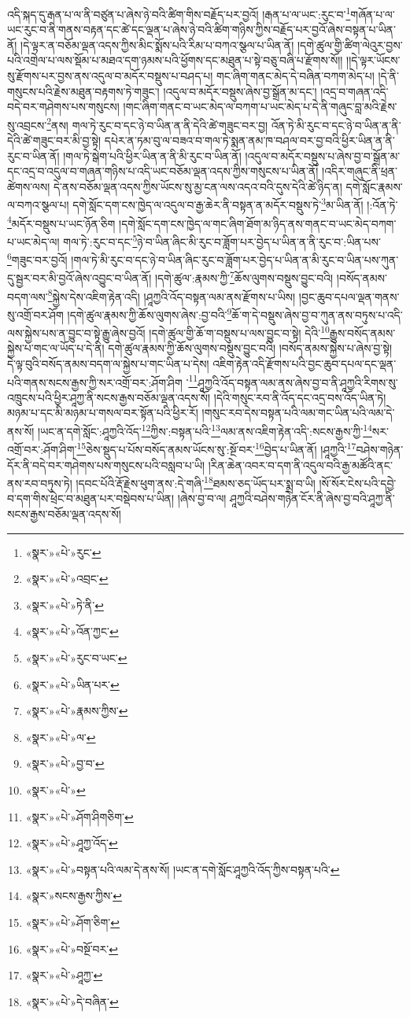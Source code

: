 འདི་སྐད་དུ་རྒན་པ་ལ་ནི་བཙུན་པ་ཞེས་ཉེ་བའི་ཚིག་གིས་བརྗོད་པར་བྱའོ། །རྒན་པ་ལ་ཡང་:རུང་བ་\footnote{«སྣར་»«པེ་»རུང་}གཞོན་པ་ལ་ཡང་རུང་བ་ནི་གནས་བརྟན་དང་ཚེ་དང་ལྡན་པ་ཞེས་ཉེ་བའི་ཚིག་གཉིས་ཀྱིས་བརྗོད་པར་བྱའོ་ཞེས་བསྟན་པ་ཡིན་ནོ། །དེ་ལྟར་ན་བཅོམ་ལྡན་འདས་ཀྱིས་མིང་སྨོས་པའི་རིམ་པ་བཀའ་སྩལ་པ་ཡིན་ནོ། །དགེ་ཚུལ་གྱི་ཚིག་ལེའུར་བྱས་པའི་འགྲེལ་པ་ལས་སྡོམ་པ་མཐའ་དག་ཉམས་པའི་ཕྱོགས་དང་མཐུན་པ་སྟེ་བཅུ་བཞི་པ་རྫོགས་སོ།། །།དེ་ལྟར་ཡོངས་སུ་རྫོགས་པར་བྱས་ནས་འདུལ་བ་མདོར་བསྡུས་པ་བཤད་པ། གང་ཞིག་གནང་མེད་དེ་བཞིན་བཀག་མེད་པ། །དེ་ནི་གསུངས་པའི་རྗེས་མཐུན་བརྟགས་ཏེ་གཟུང་། །འདུལ་བ་མདོར་བསྡུས་ཞེས་བྱ་སྒྲོན་མ་དང་། །འདྲ་བ་གཞན་འདི་བདེ་བར་གཤེགས་པས་གསུངས། །གང་ཞིག་གནང་བ་ཡང་མེད་ལ་བཀག་པ་ཡང་མེད་པ་དེ་ནི་གཞུང་བླ་མའི་རྗེས་སུ་འབྲངས་\footnote{«སྣར་»«པེ་»འབྲང་}ནས། གལ་ཏེ་རུང་བ་དང་ཉེ་བ་ཡིན་ན་ནི་དེའི་ཚེ་གཟུང་བར་བྱ། འོན་ཏེ་མི་རུང་བ་དང་ཉེ་བ་ཡིན་ན་ནི་དེའི་ཚེ་གཟུང་བར་མི་བྱ་སྟེ། དཔེར་ན་ཏམ་བུ་ལ་བཟའ་བ་གལ་ཏེ་སྨན་ནམ་ཁ་བཤལ་བར་བྱ་བའི་ཕྱིར་ཡིན་ན་ནི་རུང་བ་ཡིན་ནོ། །གལ་ཏེ་སྒེག་པའི་ཕྱིར་ཡིན་ན་ནི་མི་རུང་བ་ཡིན་ནོ། །འདུལ་བ་མདོར་བསྡུས་པ་ཞེས་བྱ་བ་སྒྲོན་མ་དང་འདྲ་བ་འདུལ་བ་གཞན་གཉིས་པ་འདི་ཡང་བཅོམ་ལྡན་འདས་ཀྱིས་གསུངས་པ་ཡིན་ནོ། །འདིར་གཞུང་ནི་ཕྲན་ཚེགས་ལས། དེ་ནས་བཅོམ་ལྡན་འདས་ཀྱིས་ཡོངས་སུ་མྱ་ངན་ལས་འདའ་བའི་དུས་དེའི་ཚེ་ཉིད་ན། དགེ་སློང་རྣམས་ལ་བཀའ་སྩལ་པ། དགེ་སློང་དག་ངས་ཁྱེད་ལ་འདུལ་བ་རྒྱ་ཆེར་ནི་བསྟན་ན་མདོར་བསྡུས་ཏེ་\footnote{«སྣར་»«པེ་»ཏེ་ནི་}མ་ཡིན་ནོ། །:འོན་ཏེ་\footnote{«སྣར་»«པེ་»འོན་ཀྱང་}མདོར་བསྡུས་པ་ཡང་ཉོན་ཅིག །དགེ་སློང་དག་ངས་ཁྱེད་ལ་གང་ཞིག་ཐོག་མ་ཉིད་ནས་གནང་བ་ཡང་མེད་བཀག་པ་ཡང་མེད་ལ། གལ་ཏེ་:རུང་བ་དང་\footnote{«སྣར་»«པེ་»རུང་བ་ཡང་}ཉེ་བ་ཡིན་ཞིང་མི་རུང་བ་ཟློག་པར་བྱེད་པ་ཡིན་ན་ནི་རུང་བ་:ཡིན་པས་\footnote{«སྣར་»«པེ་»ཡིན་པར་}གཟུང་བར་བྱའོ། །གལ་ཏེ་མི་རུང་བ་དང་ཉེ་བ་ཡིན་ཞིང་རུང་བ་ཟློག་པར་བྱེད་པ་ཡིན་ན་མི་རུང་བ་ཡིན་པས་ཀུན་དུ་སྦྱར་བར་མི་བྱའོ་ཞེས་འབྱུང་བ་ཡིན་ནོ། །དགེ་ཚུལ་:རྣམས་ཀྱི་\footnote{«སྣར་»«པེ་»རྣམས་ཀྱིས་}ཆོས་ལུགས་བསྡུས་བྱུང་བའི། །བསོད་ནམས་བདག་ལས་\footnote{«སྣར་»«པེ་»ལ་}སྐྱེས་དེས་འཇིག་རྟེན་འདི། །ཤཱཀྱའི་འོད་བསྟན་ལམ་ནས་རྫོགས་པ་ཡིས། །བྱང་ཆུབ་དཔལ་ལྡན་གནས་སུ་འགྲོ་བར་ཤོག །དགེ་ཚུལ་རྣམས་ཀྱི་ཆོས་ལུགས་ཞེས་:བྱ་བའི་\footnote{«སྣར་»«པེ་»བྱ་བ་}ཆོ་ག་དེ་བསྡུས་ཞེས་བྱ་བ་ཀུན་ནས་བཏུས་པ་འདི་ལས་སྐྱེས་པས་ན་བྱུང་བ་སྟེ་རྒྱུ་ཞེས་བྱའོ། །དགེ་ཚུལ་གྱི་ཆོ་ག་བསྡུས་པ་ལས་བྱུང་བ་སྟེ། དེའི་\footnote{«སྣར་»«པེ་»}རྒྱུས་བསོད་ནམས་སྐྱེས་པ་གང་ལ་ཡོད་པ་དེ་ནི། དགེ་ཚུལ་རྣམས་ཀྱི་ཆོས་ལུགས་བསྡུས་བྱུང་བའི། །བསོད་ནམས་སྐྱེས་པ་ཞེས་བྱ་སྟེ། དེ་ལྟ་བུའི་བསོད་ནམས་བདག་ལ་སྐྱེས་པ་གང་ཡིན་པ་དེས། འཇིག་རྟེན་འདི་རྫོགས་པའི་བྱང་ཆུབ་དཔལ་དང་ལྡན་པའི་གནས་སངས་རྒྱས་ཀྱི་སར་འགྲོ་བར་:ཤོག་ཤིག ་\footnote{«སྣར་»«པེ་»ཤོག་ཤིགཅིག་}ཤཱཀྱའི་འོད་བསྟན་ལམ་ནས་ཞེས་བྱ་བ་ནི་ཤཱཀྱའི་རིགས་སུ་འཁྲུངས་པའི་ཕྱིར་ཤཱཀྱ་ནི་སངས་རྒྱས་བཅོམ་ལྡན་འདས་སོ། །དེའི་གསུང་རབ་ནི་འོད་དང་འདྲ་བས་འོད་ཡིན་ཏེ། མཉམ་པ་དང་མི་མཉམ་པ་གསལ་བར་སྟོན་པའི་ཕྱིར་རོ། །གསུང་རབ་དེས་བསྟན་པའི་ལམ་གང་ཡིན་པའི་ལམ་དེ་ནས་སོ། །ཡང་ན་དགེ་སློང་:ཤཱཀྱའི་འོད་\footnote{«སྣར་»«པེ་»ཤཱཀྱ་འོད་}ཀྱིས་:བསྟན་པའི་\footnote{«སྣར་»«པེ་»བསྟན་པའི་ལམ་དེ་ནས་སོ། །ཡང་ན་དགེ་སློང་ཤཱཀྱའི་འོད་ཀྱིས་བསྟན་པའི་}ལམ་ནས་འཇིག་རྟེན་འདི་:སངས་རྒྱས་ཀྱི་\footnote{«སྣར་»སངས་རྒྱས་ཀྱིས་}སར་འགྲོ་བར་:ཤོག་ཤིག་\footnote{«སྣར་»«པེ་»ཤོག་ཅིག་}ཅེས་སྡུད་པ་པོས་བསོད་ནམས་ཡོངས་སུ་:སྔོ་བར་\footnote{«སྣར་»«པེ་»བསྔོ་བར་}བྱེད་པ་ཡིན་ནོ། །ཤཱཀྱའི་\footnote{«སྣར་»«པེ་»ཤཱཀྱ་}བཤེས་གཉེན་དོར་ནི་བདེ་བར་གཤེགས་པས་གསུངས་པའི་བསླབ་པ་ཡི། །རིན་ཆེན་འབར་བ་དག་ནི་འདུལ་བའི་རྒྱ་མཚོའི་ནང་ནས་རབ་བཏུས་ཏེ། །དབང་པོའི་རྡོ་རྗེས་ཕུག་ནས་:དེ་གཞི་\footnote{«སྣར་»«པེ་»དེ་བཞིན་}ཐམས་ཅད་ཡོད་པར་སྨྲ་བ་ཡི། །སོ་སོར་ངེས་པའི་དབྱེ་བ་དག་གིས་ཕྲེང་བ་མཐུན་པར་བསྡེབས་པ་ཡིན། །ཞེས་བྱ་བ་ལ། ཤཱཀྱའི་བཤེས་གཉེན་ངོར་ནི་ཞེས་བྱ་བའི་ཤཱཀྱ་ནི་སངས་རྒྱས་བཅོམ་ལྡན་འདས་སོ། 